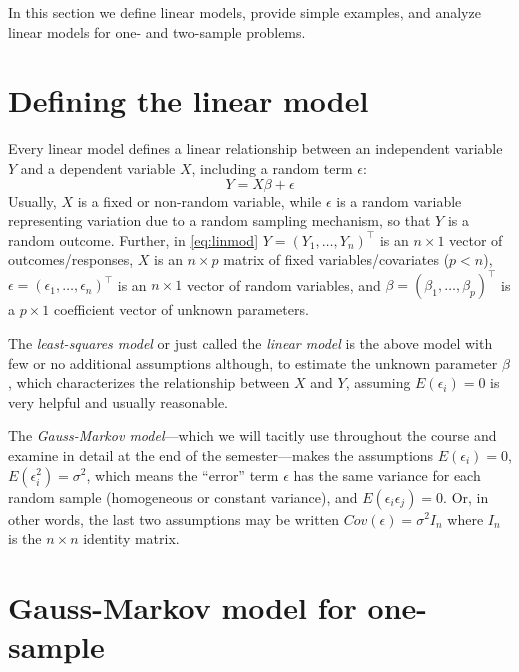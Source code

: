 \documentclass[
]{book}
\theoremstyle{definition}
\theoremstyle{definition}
\theoremstyle{definition}
\theoremstyle{definition}
\theoremstyle{remark}
\begin{document}
In this section we define linear models, provide simple examples, and analyze linear models for one- and two-sample problems.

\hypertarget{defining-the-linear-model}{%
\section{Defining the linear model}\label{defining-the-linear-model}}

Every linear model defines a linear relationship between an independent variable \(Y\) and a dependent variable \(X\), including a random term \(\epsilon\):
\begin{equation}
Y = X\beta + \epsilon
  \label{eq:linmod}
\end{equation}
Usually, \(X\) is a fixed or non-random variable, while \(\epsilon\) is a random variable representing variation due to a random sampling mechanism, so that \(Y\) is a random outcome. Further, in \eqref{eq:linmod} \(Y = (Y_1, \ldots, Y_n)^\top\) is an \(n\times 1\) vector of outcomes/responses, \(X\) is an \(n\times p\) matrix of fixed variables/covariates (\(p<n\)), \(\epsilon = (\epsilon_1, \ldots, \epsilon_n)^\top\) is an \(n\times 1\) vector of random variables, and \(\beta = (\beta_1, \ldots, \beta_p)^{\top}\) is a \(p\times 1\) coefficient vector of unknown parameters.

The \emph{least-squares model} or just called the \emph{linear model} is the above model with few or no additional assumptions although, to estimate the unknown parameter \(\beta\), which characterizes the relationship between \(X\) and \(Y\), assuming \(E(\epsilon_i) = 0\) is very helpful and usually reasonable.

The \emph{Gauss-Markov model}---which we will tacitly use throughout the course and examine in detail at the end of the semester---makes the assumptions \(E(\epsilon_i) = 0\), \(E(\epsilon_i^2) = \sigma^2\), which means the ``error'' term \(\epsilon\) has the same variance for each random sample (homogeneous or constant variance), and \(E(\epsilon_i\epsilon_j)=0\). Or, in other words, the last two assumptions may be written \(Cov(\epsilon) = \sigma^2 I_{n}\) where \(I_n\) is the \(n\times n\) identity matrix.

\hypertarget{gauss-markov-model-for-one-sample}{%
\section{Gauss-Markov model for one-sample}\label{gauss-markov-model-for-one-sample}}
\end{document}
